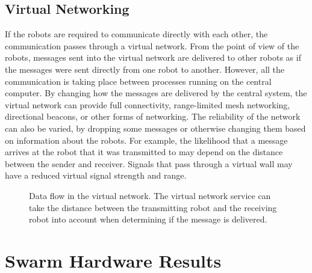 \subsection{Virtual Networking} \label{section:Virtual_Networking}

If the robots are required to communicate directly with each other, the communication passes through a virtual network.
From the point of view of the robots, messages sent into the virtual network are delivered to other robots as if the messages were sent directly from one robot to another. 
However, all the communication is taking place between processes running on the central computer.
By changing how the messages are delivered by the central system, the virtual network can provide full connectivity, range-limited mesh networking, directional beacons, or other forms of networking. 
The reliability of the network can also be varied, by dropping some messages or otherwise changing them based on information about the robots. 
For example, the likelihood that a message arrives at the robot that it was transmitted to may depend on the distance between the sender and receiver.
Signals that pass through a virtual wall may have a reduced virtual signal strength and range.

 \begin{figure}
 	\centering
	\caption{Data flow in the virtual network. The virtual network service can take the distance between the transmitting robot and the receiving robot into account when determining if the message is delivered.}
 \end{figure}

\section{Swarm Hardware Results} \label{section:The_Desert_of_the_Real}

